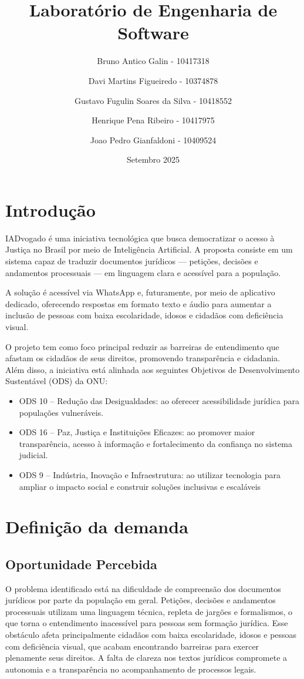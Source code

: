 \documentclass{article}
\title{Laboratório de Engenharia de Software}
\date{Setembro 2025}
\author{Bruno Antico Galin - 10417318 \and 
Davi Martins Figueiredo - 10374878 \and
Gustavo Fugulin Soares da Silva - 10418552 \and
Henrique Pena Ribeiro - 10417975 \and
Joao Pedro Gianfaldoni - 10409524}
\begin{document}
\maketitle
\newpage


\tableofcontents

\newpage



\section{Introdução}
IADvogado é uma iniciativa tecnológica que busca democratizar o acesso à Justiça no Brasil por meio de Inteligência Artificial. A proposta consiste em um sistema capaz de traduzir documentos jurídicos — petições, decisões e andamentos processuais — em linguagem clara e acessível para a população.

A solução é acessível via WhatsApp e, futuramente, por meio de aplicativo dedicado, oferecendo respostas em formato texto e áudio para aumentar a inclusão de pessoas com baixa escolaridade, idosos e cidadãos com deficiência visual.

O projeto tem como foco principal reduzir as barreiras de entendimento que afastam os cidadãos de seus direitos, promovendo transparência e cidadania. Além disso, a iniciativa está alinhada aos seguintes Objetivos de Desenvolvimento Sustentável (ODS) da ONU:
\begin{itemize}
    \item ODS 10 – Redução das Desigualdades: ao oferecer acessibilidade jurídica para populações vulneráveis.
    \item ODS 16 – Paz, Justiça e Instituições Eficazes: ao promover maior transparência, acesso à informação e fortalecimento da confiança no sistema judicial.
    \item ODS 9 – Indústria, Inovação e Infraestrutura: ao utilizar tecnologia para ampliar o impacto social e construir soluções inclusivas e escaláveis
\end{itemize}

\section{Definição da demanda}
    \subsection{Oportunidade Percebida}
    O problema identificado está na dificuldade de compreensão dos documentos jurídicos por parte da população em geral. Petições, decisões e andamentos processuais utilizam uma linguagem técnica, repleta de jargões e formalismos, o que torna o entendimento inacessível para pessoas sem formação jurídica. Esse obstáculo afeta principalmente cidadãos com baixa escolaridade, idosos e pessoas com deficiência visual, que acabam encontrando barreiras para exercer plenamente seus direitos. A falta de clareza nos textos jurídicos compromete a autonomia e a transparência no acompanhamento de processos legais.
\end{document}
